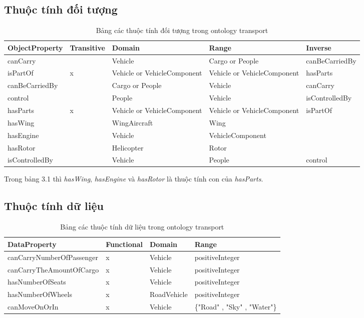 {\subsection{Thuộc tính đối tượng}
\begin{table}[h!]
	\centering
\begin{tabular}{|p{3cm}|l|p{3cm}|p{3cm}|p{3cm}|}
\hline
ObjectProperty & Transitive & Domain & Range & Inverse \\ \hline
canCarry & & Vehicle & Cargo or People & canBeCarriedBy \\ \hline
isPartOf & x & Vehicle or VehicleComponent & Vehicle or VehicleComponent & hasParts \\ \hline
canBeCarriedBy & & Cargo or People & Vehicle & canCarry \\ \hline
control &  & People & Vehicle & isControlledBy \\ \hline
hasParts & x & Vehicle or VehicleComponent & Vehicle or VehicleComponent & isPartOf \\ \hline
 hasWing & & WingAircraft & Wing & \\ \hline
 hasEngine & & Vehicle & VehicleComponent & \\ \hline
 hasRotor & & Helicopter & Rotor & \\ \hline
 isControlledBy & & Vehicle & People & control \\
\hline
\end{tabular}
\caption{Bảng các thuộc tính đối tượng trong ontology transport \label{overflow}}  
\end{table}
Trong bảng 3.1 thì \textit{hasWing}, \textit{hasEngine} và \textit{hasRotor} là thuộc tính con của \textit{hasParts}.
\subsection{Thuộc tính dữ liệu}
\begin{table}[H]
\centering
\begin{tabular}{|l|l|l|l|}
\hline
DataProperty & Functional & Domain & Range \\ \hline
canCarryNumberOfPassenger & x & Vehicle & positiveInteger \\ \hline
canCarryTheAmountOfCargo & x & Vehicle & positiveInteger  \\ \hline
hasNumberOfSeats & x & Vehicle & positiveInteger \\ \hline
hasNumberOfWheels & x & RoadVehicle & positiveInteger  \\ \hline
canMoveOnOrIn & x & Vehicle & \{"Road" , "Sky" , "Water"\}  \\ \hline
\end{tabular}
\caption{Bảng các thuộc tính dữ liệu trong ontology transport \label{overflow}}  
\end{table}
}
